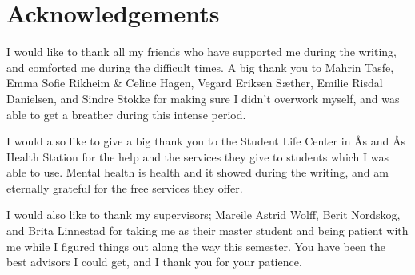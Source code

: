 \section*{Acknowledgements}

I would like to thank all my friends who have supported me during the writing, and comforted me during the difficult times. A big thank you to Mahrin Tasfe, Emma Sofie Rikheim \& Celine Hagen, Vegard Eriksen Sæther, Emilie Risdal Danielsen, and Sindre Stokke for making sure I didn't overwork myself, and was able to get a breather during this intense period.

I would also like to give a big thank you to the Student Life Center in Ås and Ås Health Station for the help and the services they give to students which I was able to use. Mental health is health and it showed during the writing, and am eternally grateful for the free services they offer.

I would also like to thank my supervisors; Mareile Astrid Wolff, Berit Nordskog, and Brita Linnestad for taking me as their master student and being patient with me while I figured things out along the way this semester. You have been the best advisors I could get, and I thank you for your patience.